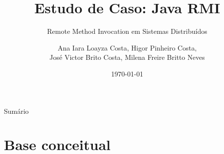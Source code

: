 \documentclass[aspectratio=169]{beamer}
\title{Estudo de Caso: Java RMI}
\subtitle{Remote Method Invocation em Sistemas Distribuídos}
\author[]{Ana Iara Loayza Costa, Higor Pinheiro Costa, \\ José Victor Brito Costa, Milena Freire Britto Neves}
\institute{Disciplina de Sistemas Distribuídos}
\date{\today}
\begin{document}
\begin{frame}
    \titlepage
\end{frame}

\begin{frame}{Sumário}
    \tableofcontents
\end{frame}

\section{Base conceitual}
 
\end{document}

